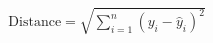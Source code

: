\documentclass[preview]{standalone}
\begin{document}
\begin{align*}
\text{Distance} = \sqrt{\sum_{i=1}^{n} (y_i - \hat{y}_i)^2}
\end{align*}
\end{document}
